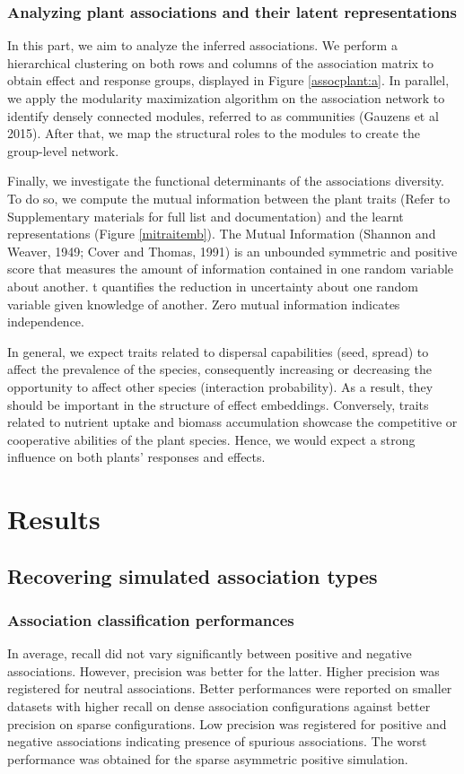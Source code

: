 \documentclass[]{article}
\begin{document}
\subsubsection{Analyzing plant associations and their latent representations}
In this part, we aim to analyze the inferred associations. We perform a hierarchical clustering on both rows and columns of the association matrix to obtain effect and response groups, displayed in Figure \ref{assocplant:a}. In parallel, we apply the modularity maximization algorithm on the association network to identify densely connected modules, referred to as communities (Gauzens et al 2015). After that, we map the structural roles to the modules to create the group-level network. 

Finally, we investigate the functional determinants of the associations diversity. To do so, we compute the mutual information between the plant traits (Refer to Supplementary materials for full list and documentation) and the learnt representations (Figure \ref{mitraitemb}). The Mutual Information (Shannon and Weaver, 1949; Cover and Thomas, 1991) is an unbounded symmetric and positive score that  measures the amount of information contained in one random variable about another. t quantifies the reduction in uncertainty about one random variable given knowledge of another. Zero mutual information indicates independence. 

In general, we expect traits related to dispersal capabilities (seed, spread) to affect the prevalence of the species, consequently increasing or decreasing the opportunity to affect other species (interaction probability). As a result, they should be important in the structure of effect embeddings. Conversely, traits related to nutrient uptake and biomass accumulation showcase the competitive or cooperative abilities of the plant species. Hence, we would expect a strong influence on both plants' responses and effects.   

\section{Results}
\subsection{Recovering simulated association types}
\subsubsection{Association classification performances}
In average, recall did not vary significantly between positive and negative associations. However, precision was better for the latter. Higher precision was registered for neutral associations. Better performances were reported on smaller datasets with higher recall  on dense association configurations against better precision on sparse configurations. Low precision was registered for positive and negative associations indicating presence of spurious associations. The worst performance was obtained for the sparse asymmetric positive simulation.  
\end{document}
